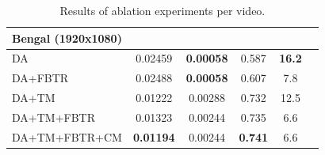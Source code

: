 \begin{table}[t]
\begin{tabular}{lccccc}
        Bengal (1920x1080) & & & &\\
        \midrule
        DA & 0.02459 & \textbf{0.00058} & 0.587 & \textbf{16.2}\\
        DA+FBTR & 0.02488 & \textbf{0.00058} & 0.607 & 7.8\\
        DA+TM & 0.01222 & 0.00288 & 0.732 & 12.5\\
        DA+TM+FBTR & 0.01323 & 0.00244 & 0.735 & 6.6\\
        DA+TM+FBTR+CM & \textbf{0.01194} & 0.00244 & \textbf{0.741} & 6.6\\
        \bottomrule
    \end{tabular}
    \caption{Results of ablation experiments per video.}
    \label{tab:ablation_tables}
\end{table}
